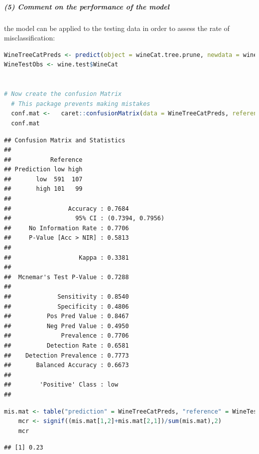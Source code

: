 \documentclass[
]{article}
\begin{document}
\newpage

\hypertarget{comment-on-the-performance-of-the-model}{%
\subparagraph{(5) Comment on the performance of the
model}\label{comment-on-the-performance-of-the-model}}

the model can be applied to the testing data in order to assess the rate of
misclassification:

\begin{lstlisting}[language=R]
WineTreeCatPreds <- predict(object = wineCat.tree.prune, newdata = wine.test, type = "class")
WineTestObs <- wine.test$WineCat


# Now create the confusion Matrix
  # This package prevents making mistakes
  conf.mat <-   caret::confusionMatrix(data = WineTreeCatPreds, reference = WineTestObs)
  conf.mat
\end{lstlisting}

\begin{lstlisting}
## Confusion Matrix and Statistics
## 
##           Reference
## Prediction low high
##       low  591  107
##       high 101   99
##                                           
##                Accuracy : 0.7684          
##                  95% CI : (0.7394, 0.7956)
##     No Information Rate : 0.7706          
##     P-Value [Acc > NIR] : 0.5813          
##                                           
##                   Kappa : 0.3381          
##                                           
##  Mcnemar's Test P-Value : 0.7288          
##                                           
##             Sensitivity : 0.8540          
##             Specificity : 0.4806          
##          Pos Pred Value : 0.8467          
##          Neg Pred Value : 0.4950          
##              Prevalence : 0.7706          
##          Detection Rate : 0.6581          
##    Detection Prevalence : 0.7773          
##       Balanced Accuracy : 0.6673          
##                                           
##        'Positive' Class : low             
## 
\end{lstlisting}

\begin{lstlisting}[language=R]
   mis.mat <- table("prediction" = WineTreeCatPreds, "reference" = WineTestObs)
    mcr <- signif((mis.mat[1,2]+mis.mat[2,1])/sum(mis.mat),2)
    mcr
\end{lstlisting}

\begin{lstlisting}
## [1] 0.23
\end{lstlisting}
\end{document}
